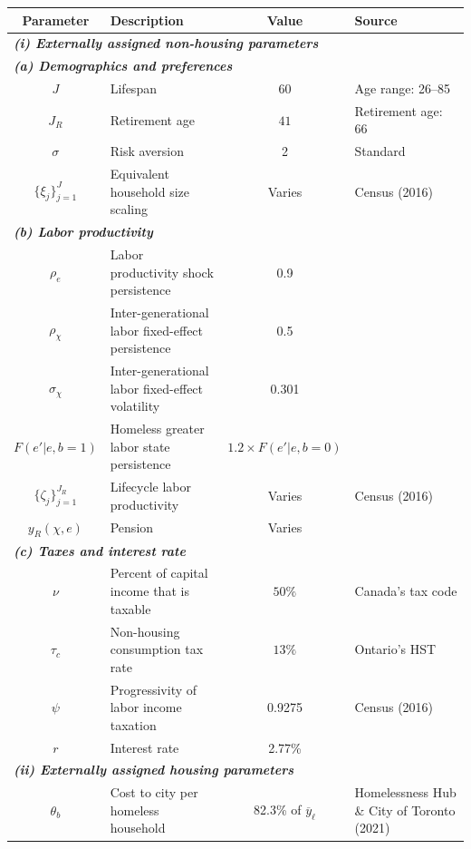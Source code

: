 \footnotesize
\renewcommand{\arraystretch}{1.2}
\begin{center}
\begin{tabular}{clcl}\toprule
\textbf{Parameter} & \textbf{Description} & \textbf{Value} & \textbf{Source}\\
\midrule
\multicolumn{4}{l}{\textit{\textbf{(i) Externally assigned non-housing parameters}}}\\
\midrule
\multicolumn{4}{l}{\textit{\textbf{(a) Demographics and preferences}}}\\
$J$ & Lifespan & $60$ & Age range: 26--85 \\
$J_{R}$ & Retirement age & $41$  & Retirement age: 66 \\
$\sigma$ & Risk aversion & 2 & Standard\\
$\{\xi_j\}_{j=1}^{J}$ & Equivalent household size scaling & Varies & Census (2016)\\
\multicolumn{4}{l}{\textit{\textbf{(b) Labor productivity}}}\\
$\rho_{e}$ & Labor productivity shock persistence & 0.9 & \citet{gkkoc} \\
$\rho_{\chi}$ & Inter-generational labor fixed-effect persistence  & 0.5 & \citet{gkkoc} \\
$\sigma_{\chi}$ & Inter-generational labor fixed-effect volatility & 0.301 & \citet{gkkoc} \\
$F(e'|e,b=1)$ & Homeless greater labor state persistence  & $1.2\times F(e'|e,b=0)$ & \citet{az-2024} \\
$\{\zeta_j\}_{j=1}^{J_R}$ & Lifecycle labor productivity & Varies & Census (2016) \\
$y_{R}(\chi,e)$ & Pension &  Varies & \citet{OECD-pension}\\
\multicolumn{4}{l}{\textit{\textbf{(c) Taxes and interest rate}}}\\
$\nu$ & Percent of capital income that is taxable & $50\%$ & Canada's tax code \\
$\tau_{c}$ & Non-housing consumption tax rate & $13\%$ & Ontario's HST \\
$\psi$ & Progressivity of labor income taxation & 0.9275 & Census (2016) \\
$r$ & Interest rate & 2.77\% & \citet{bruneau-etal-2018} \\
\midrule
\multicolumn{4}{l}{\textit{\textbf{(ii) Externally assigned housing parameters}}}\\
\midrule
$\theta_b$ & Cost to city per homeless household & 82.3\% of $\overline{y}_{\ell}$ & Homelessness Hub \& City of Toronto (2021) \\

\end{tabular}
\end{center}
